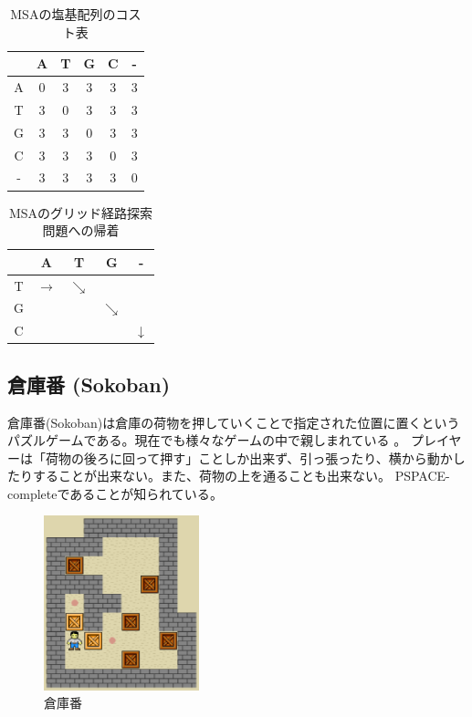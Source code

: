 \begin{table}
  \centering
\caption{MSAの塩基配列のコスト表}
\begin{tabular}{c|ccccc}
	  & A & T & G & C & - \\ \hline
	A & 0 & 3 & 3 & 3 & 3 \\
	T & 3 & 0 & 3 & 3 & 3 \\
	G & 3 & 3 & 0 & 3 & 3 \\
	C & 3 & 3 & 3 & 0 & 3 \\
	- & 3 & 3 & 3 & 3 & 0 \\
\end{tabular}
\label{tbl:msa-cost}
\end{table}

\begin{table}
  \centering
\caption{MSAのグリッド経路探索問題への帰着}
\begin{tabular}{c|cccc}
	  & A & T & G & - \\ \hline
	T & $\rightarrow$ & $\searrow$ &   &   \\
	G &   &   & $\searrow$ &   \\
	C &   &   &   & $\downarrow$ \\
\end{tabular}
\label{tbl:msa-to-grid}
\end{table}


\subsection{倉庫番 (Sokoban)}
倉庫番(Sokoban)は倉庫の荷物を押していくことで指定された位置に置くというパズルゲームである。現在でも様々なゲームの中で親しまれている \cite{junghanns1997sokoban,culberson:97}。
プレイヤーは「荷物の後ろに回って押す」ことしか出来ず、引っ張ったり、横から動かしたりすることが出来ない。また、荷物の上を通ることも出来ない。
PSPACE-completeであることが知られている\cite{culberson:97}。


\begin{figure}
\centering
\includegraphics[bb=0 0 213 238,width=0.4\textwidth]{figures/sokoban.eps}
\caption{倉庫番}
\label{fig:sokoban}
\end{figure}

